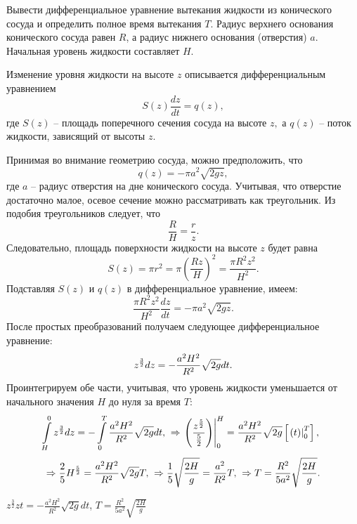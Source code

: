 \begin{ex}
Вывести дифференциальное уравнение вытекания жидкости из конического сосуда и определить полное время вытекания $T$. Радиус верхнего основания конического сосуда равен $R$, а радиус нижнего основания (отверстия) $a$. Начальная уровень жидкости составляет $H$.
\begin{sol}
Изменение уровня жидкости на высоте \(z\) описывается дифференциальным уравнением
\[S\left( z \right)\frac{{dz}}{{dt}} = q\left( z \right),\]
где \(S\left( z \right)\) -- площадь поперечного сечения сосуда на высоте \(z,\) а \(q\left( z \right)\) -- поток жидкости, зависящий от высоты $z$.

Принимая во внимание геометрию сосуда, можно предположить, что \[q\left( z \right) =  - \pi {a^2}\sqrt {2gz} ,\] где \(a\) -- радиус отверстия на дне конического сосуда. Учитывая, что отверстие достаточно малое, осевое сечение можно рассматривать как треугольник. Из подобия треугольников следует, что \[\frac{R}{H} = \frac{r}{z}.\] Следовательно, площадь поверхности жидкости на высоте \(z\) будет равна
\[
{S\left( z \right) = \pi {r^2} }
= {\pi {\left( {\frac{{Rz}}{H}} \right)^2} }
= {\frac{{\pi {R^2}{z^2}}}{{{H^2}}}.}
\]
Подставляя \(S\left( z \right)\) и \(q\left( z \right)\) в дифференциальное уравнение, имеем:
\[\frac{{\pi {R^2}{z^2}}}{{{H^2}}}\frac{{dz}}{{dt}} =  - \pi {a^2}\sqrt {2gz} .\]
После простых преобразований получаем следующее дифференциальное уравнение:
\[{z^{\large\frac{3}{2}\normalsize}}dz =  - \frac{{{a^2}{H^2}}}{{{R^2}}}\sqrt {2g} dt.\]
Проинтегрируем обе части, учитывая, что уровень жидкости уменьшается от начального значения \(H\) до нуля за время \(T:\)
\[
{\int\limits_H^0 {{z^{\large\frac{3}{2}\normalsize}}dz}  =  - \int\limits_0^T {\frac{{{a^2}{H^2}}}{{{R^2}}}\sqrt {2g} dt} ,}\;\; 
{\Rightarrow \left. {\left( {\frac{{{z^{\large\frac{5}{2}\normalsize}}}}{{\frac{5}{2}}}} \right)} \right|_0^H = \frac{{{a^2}{H^2}}}{{{R^2}}}\sqrt {2g} \left[ {\left. {\left( t \right)} \right|_0^T} \right],}\;\;
\]
\[ 
{\Rightarrow \frac{2}{5}{H^{\large\frac{5}{2}\normalsize}} = \frac{{{a^2}{H^2}}}{{{R^2}}}\sqrt {2g} T,}\;\; 
{\Rightarrow \frac{1}{5}\sqrt {\frac{{2H}}{g}}  = \frac{{{a^2}}}{{{R^2}}}T,}\;\; 
{\Rightarrow T = \frac{{{R^2}}}{{5{a^2}}}\sqrt {\frac{{2H}}{g}} .}
\]
\end{sol}
\begin{ans}
$z^{\frac{3}{2}}zt = - \frac{a^2H^2}{R^2}\sqrt{2g}dt$, $T = \frac{R^2}{5a^2}\sqrt{\frac{2H}{g}}$
\end{ans}
\end{ex}

